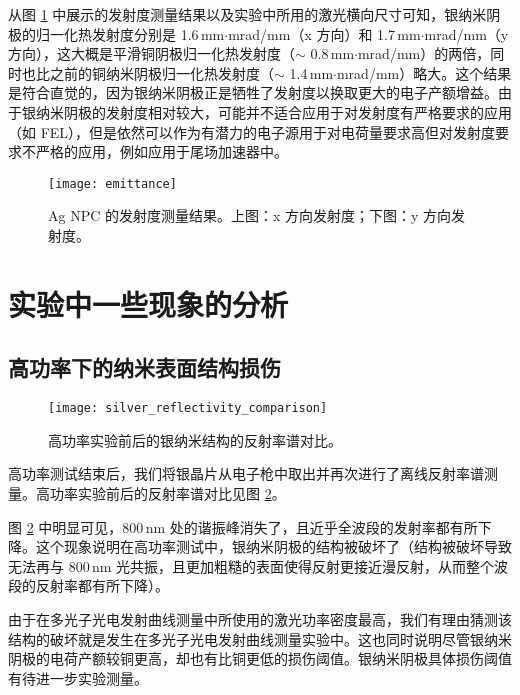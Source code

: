 从图 \ref{fig:emittance} 中展示的发射度测量结果以及实验中所用的激光横向尺寸可知，银纳米阴极的归一化热发射度分别是 1.6\,mm$\cdot$mrad/mm（x 方向）和 1.7\,mm$\cdot$mrad/mm（y 方向），这大概是平滑铜阴极归一化热发射度（$\sim$ 0.8\,mm$\cdot$mrad/mm）的两倍，同时也比之前的铜纳米阴极归一化热发射度（$\sim$ 1.4\,mm$\cdot$mrad/mm）\cite{Li:2013aa}略大。这个结果是符合直觉的，因为银纳米阴极正是牺牲了发射度以换取更大的电子产额增益。由于银纳米阴极的发射度相对较大，可能并不适合应用于对发射度有严格要求的应用（如 FEL），但是依然可以作为有潜力的电子源用于对电荷量要求高但对发射度要求不严格的应用，例如应用于尾场加速器中。
\begin{figure}[htbp]
\begin{center}
\texttt{[image: emittance]}
\caption{\label{fig:emittance} 
Ag NPC 的发射度测量结果。上图：x 方向发射度；下图：y 方向发射度。}
\end{center}
\end{figure}

\section{实验中一些现象的分析\label{sec:misc}}
\subsection{高功率下的纳米表面结构损伤}
\begin{figure}[htbp]
\begin{center}
\texttt{[image: silver\_reflectivity\_comparison]}
\caption{\label{fig:afterhighpower} 高功率实验前后的银纳米结构的反射率谱对比。}
\end{center}
\end{figure}

高功率测试结束后，我们将银晶片从电子枪中取出并再次进行了离线反射率谱测量。高功率实验前后的反射率谱对比见图 \ref{fig:afterhighpower}。

图 \ref{fig:afterhighpower} 中明显可见，800\,nm 处的谐振峰消失了，且近乎全波段的发射率都有所下降。这个现象说明在高功率测试中，银纳米阴极的结构被破坏了（结构被破坏导致无法再与 800\,nm 光共振，且更加粗糙的表面使得反射更接近漫反射，从而整个波段的反射率都有所下降）。

由于在多光子光电发射曲线测量中所使用的激光功率密度最高，我们有理由猜测该结构的破坏就是发生在多光子光电发射曲线测量实验中。这也同时说明尽管银纳米阴极的电荷产额较铜更高，却也有比铜更低的损伤阈值。银纳米阴极具体损伤阈值有待进一步实验测量。

